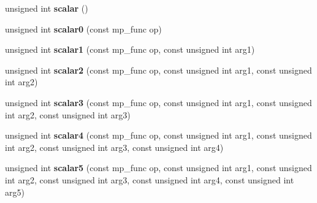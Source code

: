 \begin{DoxyCompactItemize}
unsigned int {\bfseries scalar} ()
\item 
\mbox{\label{structcimg__library__suffixed_1_1CImg_1_1__cimg__math__parser_a7e2f883a1d6660c9e233ccfd8e611ae5}} 
unsigned int {\bfseries scalar0} (const mp\+\_\+func op)
\item 
\mbox{\label{structcimg__library__suffixed_1_1CImg_1_1__cimg__math__parser_a4f752a0ab16ff11f66cbe36c41d28e6e}} 
unsigned int {\bfseries scalar1} (const mp\+\_\+func op, const unsigned int arg1)
\item 
\mbox{\label{structcimg__library__suffixed_1_1CImg_1_1__cimg__math__parser_a71ad73003cc670f148a36c031bfdb63e}} 
unsigned int {\bfseries scalar2} (const mp\+\_\+func op, const unsigned int arg1, const unsigned int arg2)
\item 
\mbox{\label{structcimg__library__suffixed_1_1CImg_1_1__cimg__math__parser_ae78d2f0d6168388fca89526501f15fa3}} 
unsigned int {\bfseries scalar3} (const mp\+\_\+func op, const unsigned int arg1, const unsigned int arg2, const unsigned int arg3)
\item 
\mbox{\label{structcimg__library__suffixed_1_1CImg_1_1__cimg__math__parser_a896a39dea48354d4621c2b3b69ca7937}} 
unsigned int {\bfseries scalar4} (const mp\+\_\+func op, const unsigned int arg1, const unsigned int arg2, const unsigned int arg3, const unsigned int arg4)
\item 
\mbox{\label{structcimg__library__suffixed_1_1CImg_1_1__cimg__math__parser_ae24ac4a9a45fd573ff49015b81c8576b}} 
unsigned int {\bfseries scalar5} (const mp\+\_\+func op, const unsigned int arg1, const unsigned int arg2, const unsigned int arg3, const unsigned int arg4, const unsigned int arg5)
\item 
\mbox{\label{structcimg__library__suffixed_1_1CImg_1_1__cimg__math__parser_a52ff1d240c30fee48cc0903832a2c6c0}} 

\end{DoxyCompactItemize}

